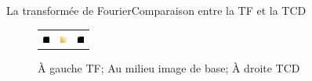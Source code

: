 \begin{frame}{La transformée de Fourier}{Comparaison entre la TF et la TCD}
	\begin{figure}
		\begin{tabular}{ c c c}
			\includegraphics[scale=13]{images/TF/comparaison_tf_tcd/diapo_tf_img.png} &
			\includegraphics[scale=13]{images/TF/comparaison_tf_tcd/diapo.png} &
			\includegraphics[scale=13]{images/TF/comparaison_tf_tcd/diapo_tcd_img.png}
		\end{tabular}
		\caption{À gauche TF; Au milieu image de base; À droite TCD}
	\end{figure}
\end{frame}
